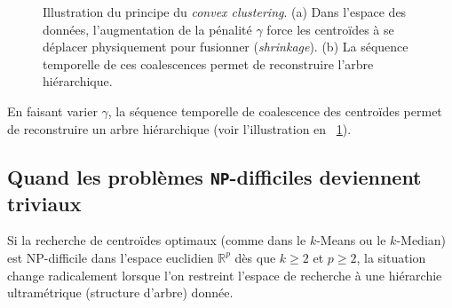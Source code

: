 \begin{figure}[ht]
    \caption{Illustration du principe du \emph{convex clustering}. (a) Dans l'espace des données, l'augmentation de la pénalité $\gamma$ force les centroïdes à se déplacer physiquement pour fusionner (\textit{shrinkage}). (b) La séquence temporelle de ces coalescences permet de reconstruire l'arbre hiérarchique.}
    \label{fig:convex_clustering_viz}
\end{figure}

En faisant varier $\gamma$, la séquence temporelle de coalescence des centroïdes permet de reconstruire un arbre hiérarchique (voir l'illustration en \Fig~\ref{fig:convex_clustering_viz}).

\subsection{Quand les problèmes \texttt{NP}-difficiles deviennent triviaux}

Si la recherche de centroïdes optimaux (comme dans le $k$-Means ou le $k$-Median) est NP-difficile dans l'espace euclidien $\mathbb R^p$ dès que $k \ge 2$ et $p \ge 2$, la situation change radicalement lorsque l'on restreint l'espace de recherche à une hiérarchie ultramétrique (structure d'arbre) donnée.

